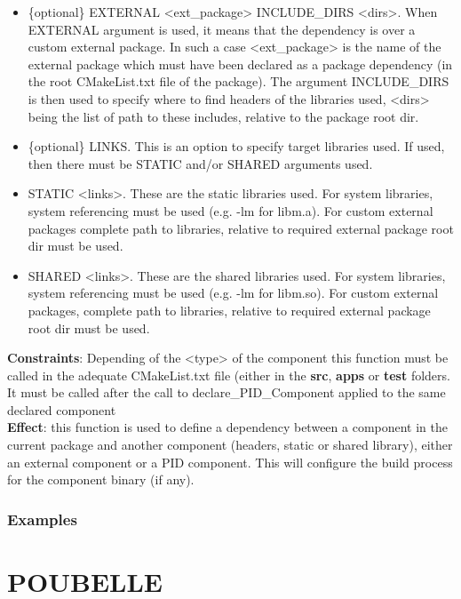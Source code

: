 \documentclass[12pt,a4paper]{article}
\begin{document}
\begin{itemize}
\begin{itemize}
\item \{optional\} EXTERNAL <ext\_package> INCLUDE\_DIRS <dirs>. When EXTERNAL argument is used, it means that the dependency is over a custom external package. In such a case <ext\_package> is the name of the external package which must have been declared as a package dependency (in the root CMakeList.txt file of the package). The argument INCLUDE\_DIRS is then used to specify where to find headers of the libraries used, <dirs> being the list of path to these includes, relative to the package root dir.
\item \{optional\} LINKS. This is an option to specify target libraries used. If used, then there must be STATIC and/or SHARED arguments used.
\item STATIC <links>. These are the static libraries used. For system libraries, system referencing must be used (e.g. -lm for libm.a). For custom external packages complete path to libraries, relative to required external package root dir must be used.
\item SHARED <links>. These are the shared libraries used. For system libraries, system referencing must be used (e.g. -lm for libm.so). For custom external packages, complete path to libraries, relative to required external package root dir must be used.
\end{itemize}
\end{itemize}
\textbf{Constraints}: Depending of the <type> of the component this function must be called in the adequate CMakeList.txt file (either in the \textbf{src}, \textbf{apps} or \textbf{test} folders. It must be called after the call to declare\_PID\_Component applied to the same declared component\\
\textbf{Effect}: this function is used to define a dependency between a component in the current package and another component (headers, static or shared library), either an external component or a PID component. This will configure the build process for the component binary (if any).

\section{Examples}
\label{sec:Examples}





\pagebreak

\part*{POUBELLE}
\end{document}
